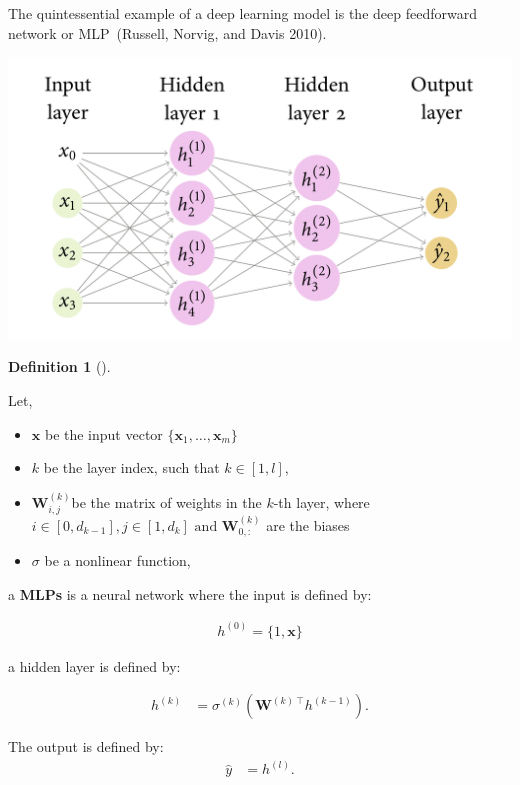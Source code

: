 \documentclass[
  letterpaper,
  12pt,
  british]{tufte-book}
\theoremstyle{plain}
\theoremstyle{definition}
\newtheorem{definition}{Definition}[chapter]
\theoremstyle{plain}
\theoremstyle{remark}
\begin{document}
The quintessential example of a deep learning model is the deep
feedforward network or {MLP}~(Russell, Norvig, and Davis
2010).

\includegraphics{Images/neuralnetwork-1.png}

\leavevmode{}%
\begin{definition}[]\label{def-MLP}

Let,

\begin{itemize}
\item
  \({\mathbf{x}}\) be the input vector
  \(\{\mathbf{x}_1, \ldots, \mathbf{x}_m\}\)
\item
  \(k\) be the layer index, such that \(k \in [1,l]\),
\item
  \(\mathbf{W}^{(k)}_{i,j}\)be the matrix of weights in the \(k\)-th
  layer, where
  \(i \in [0,d_{k-1}], j \in [1, d_k] \text{ and }\mathbf{W}^{(k)}_{0,:}\)
  are the biases
\item
  \(\sigma\) be a nonlinear function,
\end{itemize}

a \textbf{{MLPs}} is a neural network where the input is defined by:

\[
 \begin{aligned}          
    h^{(0)}= \{1, \mathbf{x}\}
 \end{aligned}
 \]

a hidden layer is defined by:

\[
 \begin{aligned}          
        h^{(k)}&=\sigma^{(k)}(\mathbf{W}^{(k)~\top} h^{(k-1)}).
 \end{aligned}
 \]

The output is defined by: \[
 \begin{aligned}          
  \hat{y}&=h^{(l)}.
 \end{aligned}
 \]

\end{definition}
\end{document}
